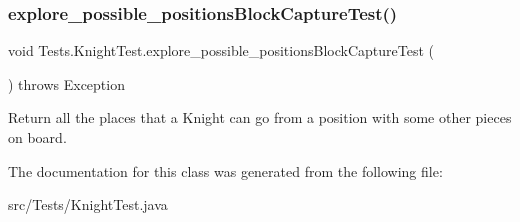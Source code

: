 \subsubsection{\texorpdfstring{explore\+\_\+possible\+\_\+positions\+Block\+Capture\+Test()}{explore\_possible\_positionsBlockCaptureTest()}}
{\footnotesize\ttfamily void Tests.\+Knight\+Test.\+explore\+\_\+possible\+\_\+positions\+Block\+Capture\+Test (\begin{DoxyParamCaption}{ }\end{DoxyParamCaption}) throws Exception\hspace{0.3cm}{\ttfamily [inline]}}

Return all the places that a Knight can go from a position with some other pieces on board. 

The documentation for this class was generated from the following file\+:\begin{DoxyCompactItemize}
\item 
src/\+Tests/Knight\+Test.\+java\end{DoxyCompactItemize}
